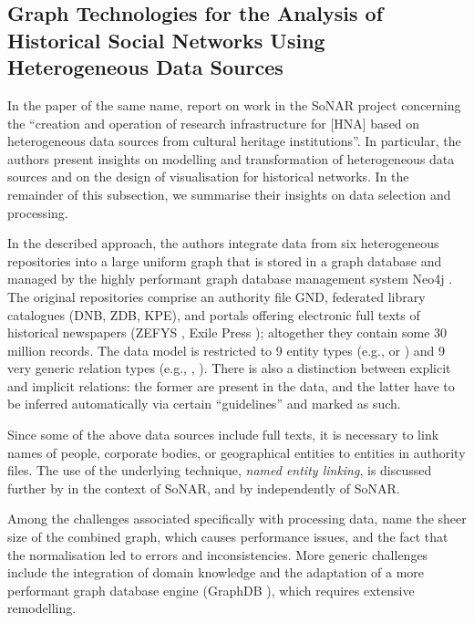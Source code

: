 \subsection{Graph Technologies for the Analysis of Historical Social Networks Using Heterogeneous Data Sources}

In the paper of the same name, \textcite{Menzel2020} report on
work in the \gls{SoNAR} project concerning the 
\enquote{creation and operation of research infrastructure
for [\gls{HNA}] based on heterogeneous data sources from cultural heritage institutions}.
In particular, the authors present insights on modelling and transformation
of heterogeneous data sources and on the design of visualisation for historical networks.
In the remainder of this subsection,
we summarise their insights on data selection and processing.

In the described approach, the authors integrate data from six heterogeneous repositories
into a large uniform graph that is stored in a graph database
and managed by the highly performant graph database management system Neo4j \autocite{Neo4j}.
The original repositories comprise an authority file \gls{GND},
federated library catalogues (\gls{DNB}, \gls{ZDB}, \gls{KPE}), %
and portals offering electronic full texts of historical newspapers 
%
(\gls{ZEFYS} \autocite{ZEFYS}, Exile Press \autocite{ExilePress});
altogether they contain some 30 million records.
The data model is restricted to 9 entity types (e.g.,  or )
and 9 very generic relation types (e.g., , ).
There is also a distinction between explicit and implicit relations:
the former are present in the data, and the latter have to be inferred automatically via
certain \enquote{guidelines} and marked as such.

Since some of the above data sources include full texts,
it is necessary to link names of people, corporate bodies, or geographical entities
to entities in authority files. The use of the underlying technique,
\emph{named entity linking}, is discussed further by \textcite{Menzel2021}
in the context of \gls{SoNAR},
and by \textcite{Meiners2022} independently of \gls{SoNAR}.

Among the challenges associated specifically with processing data,
\textcite{Menzel2020} name
the sheer size of the combined graph, which causes performance issues,
and the fact that the normalisation led to errors and inconsistencies.
More generic challenges include the integration of domain knowledge
and the adaptation of a more performant graph database engine (GraphDB \autocite{GraphDB}),
which requires extensive remodelling.

